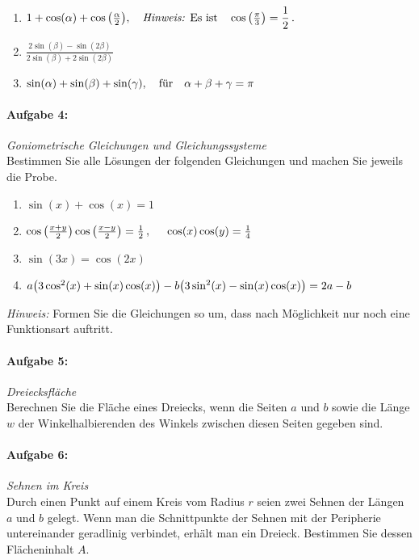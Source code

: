 \begin{enumerate}[label=(\alph*)]
    \item $1+\cos(\alpha) + \cos\qty(\frac{\alpha}{2}), \qq{\emph{Hinweis:} Es ist} \cos\qty(\frac{\pi}{3})=\dfrac{1}{2}\,.$
    \item $\frac{2\sin(\beta) - \sin (2\beta)}{2\sin(\beta)+2\sin(2\beta)}$
    \item $\sin(\alpha)+\sin(\beta)+\sin(\gamma), \qq{für} \alpha+\beta+\gamma = \pi$
\end{enumerate}
%
\paragraph{Aufgabe 4: } \emph{Goniometrische Gleichungen und Gleichungssysteme}\\[0.2cm]
Bestimmen Sie alle Lösungen der folgenden Gleichungen und machen Sie jeweils die Probe.
\begin{enumerate}[label=(\alph*)]
    \item $\sin(x)+\cos(x)= 1$
    \item $\cos\qty(\frac{x+y}{2})\cos\qty(\frac{x-y}{2})=\frac{1}{2}\,, \hspace{0.5cm}\cos(x)\cos(y)=\frac{1}{4}$
    \item $\sin(3x)=\cos(2x)$
    \item $a\qty(3\cos^2(x)+\sin(x)\cos(x))-b\qty(3\sin^2(x)-\sin(x)\cos(x))=2a-b$
\end{enumerate}
\emph{Hinweis:} Formen Sie die Gleichungen so um, dass nach Möglichkeit  nur noch eine Funktionsart auftritt.
%
\paragraph{Aufgabe 5: } \emph{Dreiecksfläche}\\[0.2cm]
Berechnen Sie die Fläche eines Dreiecks, wenn die Seiten $a$ und $b$ sowie die Länge $w$ der Winkelhalbierenden des Winkels zwischen diesen Seiten gegeben sind.
%
\paragraph{Aufgabe 6: } \emph{Sehnen im Kreis}\\[0.2cm]
Durch einen Punkt auf einem Kreis vom Radius $r$ seien zwei Sehnen der Längen $a$ und $b$ gelegt. Wenn man die Schnittpunkte der Sehnen mit der Peripherie untereinander geradlinig verbindet, erhält man ein Dreieck. Bestimmen Sie dessen Flächeninhalt $A$.
